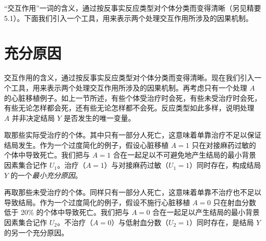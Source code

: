 “交互作用”一词的含义，通过按反事实反应类型对个体分类而变得清晰（另见精要 5.1）。下面我们引入一个工具，用来表示两个处理交互作用所涉及的因果机制。

\section{充分原因}

交互作用的含义，通过按反事实反应类型对个体分类而变得清晰。现在我们引入一个工具，用来表示两个处理交互作用所涉及的因果机制。再考虑只有一个处理 $A$ 的心脏移植例子。如上一节所述，有些个体受治疗时会死，有些未受治疗时会死，有些无论怎样都会死，还有些无论怎样都不会死。反应类型如此多样，说明处理 $A$ 并非决定结局 $Y$ 是否发生的唯一变量。

取那些实际受治疗的个体。其中只有一部分人死亡，这意味着单靠治疗不足以保证结局发生。作为一个过度简化的例子，假设心脏移植 $A=1$ 只在对接麻药过敏的个体中导致死亡。我们把与 $A=1$ 合在一起足以不可避免地产生结局的最小背景因素集合记作 $U_1$。治疗（$A=1$）与对接麻药过敏（$U_1=1$）同时存在，构成结局 $Y$ 的一个\emph{最小充分原因}。

再取那些未受治疗的个体。同样只有一部分人死亡，这意味着单靠不治疗也不足以导致结局。作为一个过度简化的例子，假设不施行心脏移植 $A=0$ 只在射血分数低于 20\% 的个体中导致死亡。我们把与 $A=0$ 合在一起足以产生结局的最小背景因素集合记作 $U_2$。不治疗（$A=0$）与低射血分数（$U_2=1$）同时存在，是结局 $Y$ 的另一个充分原因。

